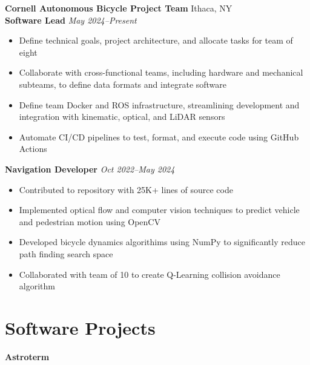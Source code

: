 \documentclass[letterpaper,10pt]{article}
\newcommand{\company}[2]{
    \vspace{7pt}
    {\large \textbf{#1}}
    \hfill
    {\normalsize {#2}}
    \\
}
\newcommand{\position}[2]{
    \vspace{5pt}
    {\normalsize \textbf {#1}}
    \hfill
    {\normalsize \textit{#2}}
    \\
}
\newcommand{\itemsBegin}{
    \begin{itemize}[leftmargin=0.2in, labelsep=0.05in, itemsep=0pt, parsep=1pt, topsep=0pt, partopsep=0pt]
    \small
}
\newcommand{\itemsEnd}{\end{itemize}}
\begin{document}
    \company{Cornell Autonomous Bicycle Project Team}{Ithaca, NY}

    \position{Software Lead}{May 2024--Present}
    \itemsBegin{}
        \item Define technical goals, project architecture, and allocate tasks for team of eight
        \item Collaborate with cross-functional teams, including hardware and mechanical subteams, to define data formats and integrate software
        \item Define team Docker and ROS infrastructure, streamlining development and integration with kinematic, optical, and LiDAR sensors
        \item Automate CI/CD pipelines to test, format, and execute code using GitHub Actions
    \itemsEnd{}

    \position{Navigation Developer}{Oct 2022--May 2024}
    \itemsBegin{}
        \item Contributed to repository with 25K+ lines of source code
        \item Implemented optical flow and computer vision techniques to predict vehicle and pedestrian motion using OpenCV
        \item Developed bicycle dynamics algorithims using NumPy to significantly reduce path finding search space
        \item Collaborated with team of 10 to create Q-Learning collision avoidance algorithm
    \itemsEnd{}

\section{Software Projects}

    \normalsize \textbf{Astroterm}
\end{document}
